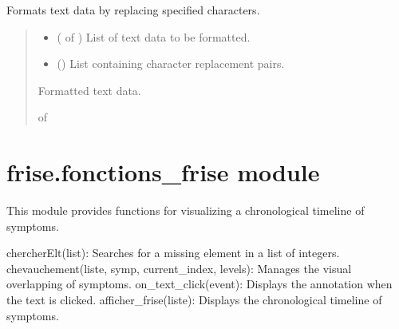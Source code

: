 \documentclass[letterpaper,10pt,english]{sphinxmanual}
\begin{document}
\begin{fulllineitems}
\label{\detokenize{frise:frise.ecriture_fichier.format}}
\pysigstartsignatures
{}
\pysigstopsignatures
\sphinxAtStartPar
Formats text data by replacing specified characters.
\begin{quote}\begin{description}
\begin{itemize}
\item {} 
\sphinxAtStartPar
{} ( of ) \textendash{} List of text data to be formatted.

\item {} 
\sphinxAtStartPar
{} () \textendash{} List containing character replacement pairs.

\end{itemize}

\sphinxAtStartPar
Formatted text data.

\sphinxAtStartPar
{} of 

\end{description}\end{quote}

\end{fulllineitems}



\section{frise.fonctions\_frise module}
\label{\detokenize{frise:module-frise.fonctions_frise}}\label{\detokenize{frise:frise-fonctions-frise-module}}
\sphinxAtStartPar
This module provides functions for visualizing a chronological timeline of symptoms.
\begin{description}
\sphinxAtStartPar
chercherElt(list): Searches for a missing element in a list of integers.
chevauchement(liste, symp, current\_index, levels): Manages the visual overlapping of symptoms.
on\_text\_click(event): Displays the annotation when the text is clicked.
afficher\_frise(liste): Displays the chronological timeline of symptoms.

\end{description}
\end{document}
